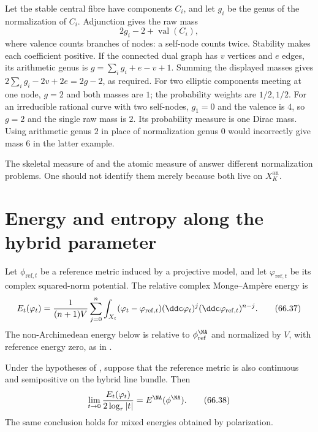 \begin{example}
\label{ex:hybrid-ke-curves}
Let the stable central fibre have components $C_i$, and let $g_i$ be the genus of the normalization of $C_i$. Adjunction gives the raw mass
\[
 2g_i-2+\operatorname{val}(C_i),
\tag{66.36}\label{eq:hybrid-stable-curve-weight}
\]
where valence counts branches of nodes: a self-node counts twice. Stability makes each coefficient positive. If the connected dual graph has $v$ vertices and $e$ edges, its arithmetic genus is $g=\sum_i g_i+e-v+1$. Summing the displayed masses gives $2\sum_i g_i-2v+2e=2g-2$, as required. For two elliptic components meeting at one node, $g=2$ and both masses are $1$; the probability weights are $1/2,1/2$. For an irreducible rational curve with two self-nodes, $g_1=0$ and the valence is $4$, so $g=2$ and the single raw mass is $2$. Its probability measure is one Dirac mass. Using arithmetic genus $2$ in place of normalization genus $0$ would incorrectly give mass $6$ in the latter example.
\end{example}

\begin{remark}
\label{rem:hybrid-two-limits}
The skeletal measure of  and the atomic measure of  answer different normalization problems. One should not identify them merely because both live on $X_K^{\mathrm{an}}$.
\end{remark}

\section{Energy and entropy along the hybrid parameter}
\label{sec:hybrid-energy-entropy}

Let $\phi_{\mathrm{ref},t}$ be a reference metric induced by a
projective model, and let $\varphi_{\mathrm{ref},t}$ be its complex
squared-norm potential. The relative complex Monge--Amp\`ere energy is
\[
 E_t(\varphi_t)
 =\frac{1}{(n+1)V}
   \sum_{j=0}^{n}
   \int_{X_t}
     (\varphi_t-\varphi_{\mathrm{ref},t})
     (\ddc\varphi_t)^j
     (\ddc\varphi_{\mathrm{ref},t})^{n-j}.
\tag{66.37}\label{eq:hybrid-energy}
\]
The non-Archimedean energy below is relative to
$\phi_{\mathrm{ref}}^{\NA}$ and normalized by $V$, with reference energy
zero, as in .

\begin{proposition}\label{prop:hybrid-energy-continuity}
Under the hypotheses of , suppose that the reference metric is also continuous and semipositive on the hybrid line bundle. Then
\[
 \lim_{t\to0}
 \frac{E_t(\varphi_t)}{2\log_r|t|}
 =E^{\NA}(\phi^{\NA}).
\tag{66.38}\label{eq:hybrid-energy-limit}
\]
The same conclusion holds for mixed energies obtained by polarization.
\end{proposition}

